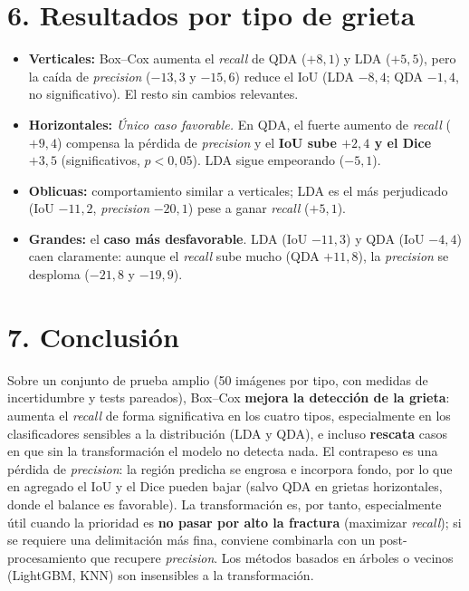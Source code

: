 \documentclass[11pt]{article}
\begin{document}
\section*{6. Resultados por tipo de grieta}
\begin{itemize}
  \item \textbf{Verticales:} Box--Cox aumenta el \emph{recall} de QDA ($+8{,}1$) y LDA ($+5{,}5$),
  pero la ca\'ida de \emph{precision} ($-13{,}3$ y $-15{,}6$) reduce el IoU (LDA $-8{,}4$;
  QDA $-1{,}4$, no significativo). El resto sin cambios relevantes.
  \item \textbf{Horizontales:} \emph{\'Unico caso favorable.} En QDA, el fuerte aumento de
  \emph{recall} ($+9{,}4$) compensa la p\'erdida de \emph{precision} y el \textbf{IoU sube
  $+2{,}4$ y el Dice $+3{,}5$} (significativos, $p<0{,}05$). LDA sigue empeorando ($-5{,}1$).
  \item \textbf{Oblicuas:} comportamiento similar a verticales; LDA es el m\'as perjudicado
  (IoU $-11{,}2$, \emph{precision} $-20{,}1$) pese a ganar \emph{recall} ($+5{,}1$).
  \item \textbf{Grandes:} el \textbf{caso m\'as desfavorable}. LDA (IoU $-11{,}3$) y QDA
  (IoU $-4{,}4$) caen claramente: aunque el \emph{recall} sube mucho (QDA $+11{,}8$), la
  \emph{precision} se desploma ($-21{,}8$ y $-19{,}9$).
\end{itemize}

\section*{7. Conclusi\'on}
Sobre un conjunto de prueba amplio (50 im\'agenes por tipo, con medidas de incertidumbre y tests
pareados), Box--Cox \textbf{mejora la detecci\'on de la grieta}: aumenta el \emph{recall} de
forma significativa en los cuatro tipos, especialmente en los clasificadores sensibles a la
distribuci\'on (LDA y QDA), e incluso \textbf{rescata} casos en que sin la transformaci\'on el
modelo no detecta nada. El contrapeso es una p\'erdida de \emph{precision}: la regi\'on predicha
se engrosa e incorpora fondo, por lo que en agregado el IoU y el Dice pueden bajar (salvo QDA en
grietas horizontales, donde el balance es favorable). La transformaci\'on es, por tanto,
especialmente \'util cuando la prioridad es \textbf{no pasar por alto la fractura} (maximizar
\emph{recall}); si se requiere una delimitaci\'on m\'as fina, conviene combinarla con un
post-procesamiento que recupere \emph{precision}. Los m\'etodos basados en \'arboles o vecinos
(LightGBM, KNN) son insensibles a la transformaci\'on.
\end{document}
